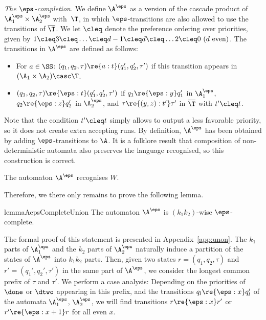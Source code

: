 \textit{The $\eps$-completion.} 
We define $\A^\eps$ as a version of the cascade product of $\A_{1}^\eps \times \A_{2}^\eps$ with~$\T$, in which $\eps$-transitions are also allowed to use the transitions of $\overline \T$.
We let $\cleq$ denote the preference ordering over priorities, given by
$ 1 \cleq 3 \cleq \dots\cleq d-1 \cleq d \cleq  \dots 2 \cleq 0 \text{ ($d$ even)}$.
The transitions in $\A^\eps$ are defined as follows:
\begin{itemize}
    \item For $a\in \SS$:
    $(q_1,q_2,\tau) \re{a:t} (q'_1,q'_2,\tau')$ if this transition appears in $(\A_{1} \times \A_{2})\casc \T$. %
    \item $(q_1,q_2,\tau) \re{\eps:t} (q'_1,q'_2,\tau')$ if $q_1\re{\eps:y}q_1'$ in $\A_1^\eps$, $q_2\re{\eps:z}q_2'$ in $\A_2^\eps$, and $\tau \re{(y,z):t'} \tau'$ in $\overline \T$ with $t' \cleq t$.
\end{itemize}

Note that the condition $t' \cleq t$ simply allows to output a less favorable priority, so it does not create extra accepting runs.
By definition, $\A^\eps$ has been obtained by adding $\eps$-transitions to $\A$.
It is a folklore result that composition of non-deterministic automata also preserves the language recognised, so this construction is correct.
\begin{claim}
    The automaton $\A^\eps$ recognises $W$.
\end{claim}

Therefore, we there only remains to prove the following lemma.

\begin{restatable}{lemma}{AepsCompleteUnion}\label{lem:A-eps-complete-union}
     The automaton $\A^\eps$ is $(k_{1}k_{2})$-wise $\eps$-complete. 
 \end{restatable}

The formal proof of this statement is presented in Appendix~\ref{app:unon}.
The $k_1$ parts of $\A_1^\eps$ and the $k_2$ parts of $\A_2^\eps$ naturally induce a partition of the states of $\A^\eps$ into $k_1k_2$ parts.
Then, given two states $r = (q_1,q_2,\tau)$ and $r' = (q_1',q_2', \tau')$ in the same part of $\A^\eps$, we consider the longest common prefix of $\tau$ and $\tau'$. We perform a case analysis: Depending on the priorities of $\done$ or $\dtwo$ appearing in this prefix, and the transitions $q_l \re{\eps:x} q_l'$ of the automata $\A_1^\eps$, $\A_2^\eps$, we will find transitions $r\re{\eps:x} r'$ or $r'\re{\eps:x+1} r$ for all even $x$.
